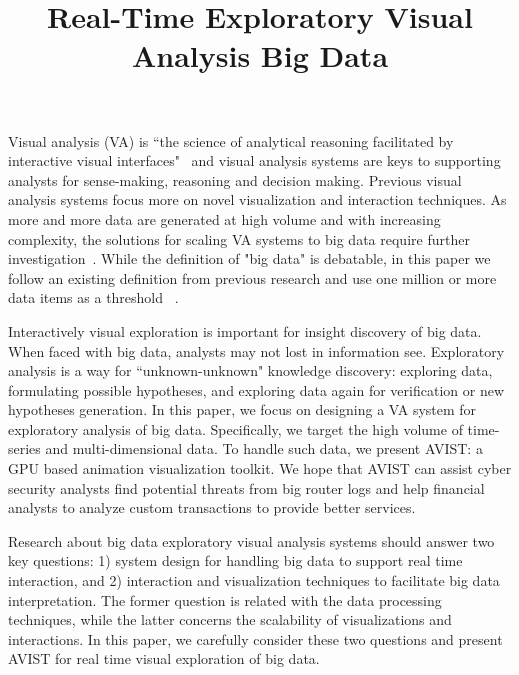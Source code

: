 \documentclass[journal]{vgtc}                %
\title{Real-Time Exploratory Visual Analysis Big Data }
\begin{document}


\maketitle

Visual analysis (VA) is ``the science of analytical reasoning facilitated by interactive visual interfaces"~\cite{Thomas2005} and visual analysis systems are keys to supporting analysts for sense-making, reasoning and decision making. Previous visual analysis systems focus more on novel visualization and interaction techniques. As more and more data are generated at high volume and with increasing complexity, the solutions for scaling VA systems to big data require further investigation~\cite{Zhang2012}. While the definition of "big data" is debatable, in this paper we follow an existing definition from previous research and use one million or more data items as a threshold ~\cite{2013-immens}.
     
Interactively visual exploration is important for insight discovery of big data. When faced with big data, analysts may not lost in information see.  Exploratory analysis is a way for ``unknown-unknown" knowledge discovery: exploring  data, formulating possible hypotheses, and exploring  data again for verification or new hypotheses generation. In this paper, we focus on designing a VA system for exploratory analysis of big data. Specifically, we target the high volume of time-series and multi-dimensional data. To handle such data, we present AVIST: a GPU based animation visualization toolkit. We hope that AVIST can  assist cyber security analysts  find potential threats from big router logs and help financial analysts to analyze custom transactions to provide better services.

Research about big data exploratory visual analysis systems should answer two key questions: 1) system design for handling big data to support real time interaction, and 2) interaction and visualization techniques to facilitate big data interpretation. The former question is related with the data processing techniques, while the latter concerns the scalability of visualizations and interactions. In this paper, we carefully consider these two questions and present AVIST for real time visual exploration of big data.
\end{document}
